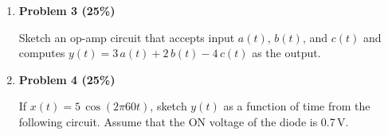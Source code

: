 \documentclass[12pt]{article}
\begin{document}
\begin{enumerate}
\begin{comment}
{\bf Solution}
\begin{itemize}
\item circuit 1:
  \[
  V_T=V_0\frac{R_2}{R_1+R_2}=3V,\;\;\;\;\;\;R_T=R_1||R_2=2.5k 
  \]
\item circuit 2:
  \[
  V_T=I_0R_2=1V,\;\;\;\;\;\;\;\;R_T=R_2=5k
  \]
\item circuit 3:
  \[
  V_T=I_0\frac{R_1R_2}{R_1+R_2}+V_0\frac{R_2}{R_1+R_2}=3.5,\;\;\;\;\;\;\;
  R_T=R_1||R_2=2.5
  \]
\item circuit 4:
  \[
  V_T=V_1\frac{R_2}{R_1+R_2}+V_2\frac{R_1}{R_1+R_2}=5V,\;\;\;\;\;\;\;
  R_T=R_1||R_2=2.5k
  \]
\item circuit 5:
  \[
  V_T=I_1R_1+I_2R_2=3V,\;\;\;\;\;\;\;R_T=R_1+R_2=10k
  \]
\item circuit 6:
  \[
  V_T=I_0R_2+V_0=7V,\;\;\;\;\;\;R_T=R_1+R_2=10k
  \]
\end{itemize}
\end{comment}

\item {\bf Problem 3 (25\%)}

  Sketch an op-amp circuit that accepts input $a(t)$, $b(t)$, and
  $c(t)$ and computes $y(t)=3\,a(t)+2\,b(t)-4\,c(t)$ as the output.

\item {\bf Problem 4 (25\%)}

  If $x(t)=5\,\cos(2\pi 60 t)$, sketch $y(t)$ as a function of time from
  the following circuit. Assume that the ON voltage of the diode is 0.7\,V.


\end{enumerate}
\end{document}
